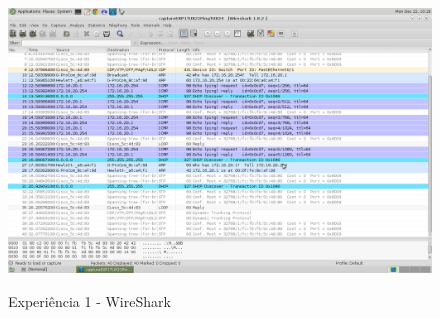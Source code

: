\documentclass[a4paper]{article}
\begin{document}
\begin{figure}[h!]
\caption{Experiência 1 - WireShark}
\includegraphics[scale=0.25]{res/image2.png}
\label{fig:teste}
\end{figure}
\end{document}
